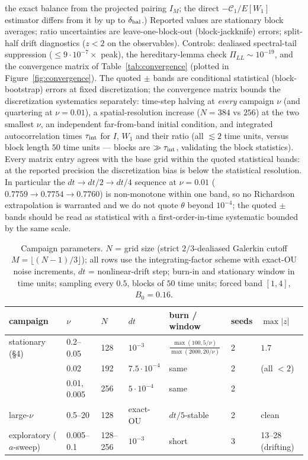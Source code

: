 \documentclass[11pt]{article}
\theoremstyle{remark}
\theoremstyle{plain}
\begin{document}
the exact balance from the projected pairing $I_M$; the direct $-\mathcal{C}_1/E[W_1]$
estimator differs from it by up to $\delta_{\rm bal}$.) Reported values are stationary block averages; ratio uncertainties are
leave-one-block-out (block-jackknife) errors; split-half drift diagnostics
($z<2$ on the observables). Controls: dealiased
spectral-tail suppression ($\le 9\cdot10^{-7}\times$ peak), the hereditary-lemma check
$\Pi_{LL}\sim10^{-19}$, and the convergence matrix of Table~\ref{tab:convergence}
(plotted in Figure~\ref{fig:convergence}). The
quoted $\pm$ bands are conditional statistical (block-bootstrap) errors at fixed
discretization; the convergence matrix bounds the discretization systematics separately:
time-step halving at \emph{every} campaign $\nu$ (and quartering at $\nu=0.01$), a
spatial-resolution increase ($N=384$ vs $256$) at the two smallest $\nu$, an independent
far-from-band initial condition, and integrated autocorrelation times
$\tau_{\rm int}$ for $I$, $W_1$ and their ratio (all $\lesssim 2$ time units, versus
block length $50$ time units --- blocks are $\gg\tau_{\rm int}$, validating the block
statistics). Every matrix entry agrees with the base grid within the quoted statistical
bands: at the reported precision the discretization bias is below the statistical
resolution. In particular the $dt \to dt/2 \to dt/4$ sequence at $\nu = 0.01$
($0.7759 \to 0.7754 \to 0.7760$) is non-monotone within one band, so no Richardson
extrapolation is warranted and we do not quote $\theta$ beyond $10^{-4}$; the quoted
$\pm$ bands should be read as statistical with a first-order-in-time systematic bounded
by the same scale.

\begin{table}[htbp]
\centering\small
\caption{Campaign parameters. $N$ = grid size (strict $2/3$-dealiased Galerkin cutoff
$M = \lfloor (N-1)/3\rfloor$); all rows use the integrating-factor scheme with exact-OU
noise increments, $dt$ = nonlinear-drift step; burn-in and stationary window in time
units; sampling every
$0.5$, blocks of $50$ time units; forced band $[1,4]$, $B_0 = 0.16$.}
\label{tab:numerics}
\begin{tabular}{l l l l l l l}
\hline
campaign & $\nu$ & $N$ & $dt$ & burn / window & seeds & $\max|z|$ \\
\hline
stationary (\S4) & 0.2--0.05 & 128 & $10^{-3}$ & $\frac{\max(100,5/\nu)}{\max(2000,20/\nu)}$ & 2 & $1.7$ \\
                 & 0.02      & 192 & $7.5{\cdot}10^{-4}$ & same & 2 & (all $<2$) \\
                 & 0.01, 0.005 & 256 & $5{\cdot}10^{-4}$ & same & 2 & \\
large-$\nu$ & 0.5--20 & 128 & exact-OU & $dt/5$-stable & 2 & clean \\
exploratory ($a$-sweep) & 0.005--0.1 & 128--256 & $10^{-3}$ & short & 3 & 13--28 (drifting) \\
\hline
\end{tabular}
\end{table}
\end{document}
